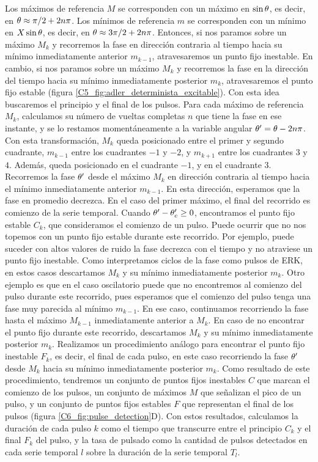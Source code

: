 \documentclass[./main.tex]{subfiles}
\begin{document}
Los máximos de referencia $M$ se corresponden con un máximo en $\sin{\ensuremath{\theta}}$, es decir, en $\theta \approx \pi/2 + 2n\pi$. Los mínimos de referencia $m$ se corresponden con un mínimo en $X\sin{\ensuremath{\theta}}$, es decir, en $\theta \approx 3\pi/2 + 2n\pi$. Entonces, si nos paramos sobre un máximo $M_k$ y recorremos la fase en dirección contraria al tiempo hacia su mínimo inmediatamente anterior $m_{k-1}$, atravesaremos un punto fijo inestable. En cambio, si nos paramos sobre un máximo $M_k$ y recorremos la fase en la dirección del tiempo hacia su mínimo inmediatamente posterior $m_{k}$, atravesaremos el punto fijo estable (figura \ref{C5_fig:adler_determinista_excitable}). Con esta idea buscaremos el principio y el final de los pulsos. Para cada máximo de referencia $M_k$, calculamos su número de vueltas completas $n$ que tiene la fase en ese instante, y se lo restamos momentáneamente a la variable angular $\theta' = \theta - 2n \pi$. Con esta transformación, $M_k$ queda posicionado entre el primer y segundo cuadrante, $m_{k-1}$ entre los cuadrantes $-1$ y $-2$, y $m_{k+1}$ entre los cuadrantes $3$ y $4$. Además, \xxe queda posicionado en el cuadrante $-1$, y \xxi en el cuadrante $3$. Recorremos la fase $\theta'$ desde el máximo $M_k$ en dirección contraria al tiempo hacia el mínimo inmediatamente anterior $m_{k-1}$. En esta dirección, esperamos que la fase \xx en promedio decrezca. En el caso del primer máximo, el final del recorrido es comienzo de la serie temporal. Cuando $\theta' - \theta_e' \geq 0$, encontramos el punto fijo estable $C_k$, que consideramos el comienzo de un pulso. Puede ocurrir que no nos topemos con un punto fijo estable durante este recorrido. Por ejemplo, puede suceder con altos valores de ruido la fase decrezca con el tiempo y no atraviese un punto fijo inestable. Como interpretamos ciclos de la fase como pulsos de ERK, en estos casos descartamos $M_k$ y su mínimo inmediatamente posterior $m_k$. Otro ejemplo es que en el caso oscilatorio puede que no encontremos al comienzo del pulso durante este recorrido, pues esperamos que el comienzo del pulso tenga una fase muy parecida al mínimo $m_{k-1}$. En ese caso, continuamos recorriendo la fase hasta el máximo $M_{k-1}$ inmediatamente anterior a $M_k$. En caso de no encontrar el punto fijo durante este recorrido, descartamos $M_k$ y su mínimo inmediatamente posterior $m_k$. Realizamos un procedimiento análogo para encontrar el punto fijo inestable $F_k$, es decir, el final de cada pulso, en este caso recorriendo la fase $\theta'$ desde $M_k$ hacia su mínimo inmediatamente posterior $m_k$. Como resultado de este procedimiento, tendremos un conjunto de puntos fijos inestables $C$ que marcan el comienzo de los pulsos, un conjunto de máximos $M$ que señalizan el pico de un pulso, y un conjunto de puntos fijos estables $F$ que representan el final de los pulsos (figura \ref{C6_fig:pulse_detection}D). Con estos resultados, calculamos la duración de cada pulso $k$ como el tiempo que transcurre entre el principio $C_k$ y el final $F_k$ del pulso, y la tasa de pulsado como la cantidad de pulsos detectados en cada serie temporal $l$ sobre la duración de la serie temporal $T_l$. 
\end{document}
